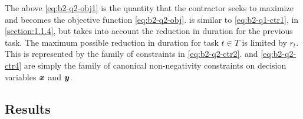 The above \cref{eq:b2-q2-obj1} is the quantity that the contractor seeks to maximize and becomes 
the objective function \cref{eq:b2-q2-obj}.  is similar to 
\cref{eq:b2-q1-ctr1}, in \cref{section:1.1.4}, but takes into account the reduction in duration
for the previous task. The maximum possible reduction in duration for task
$t\in T$ is limited by $r_t$. This is represented by the family of constraints
in \cref{eq:b2-q2-ctr2}.  and \cref{eq:b2-q2-ctr4} are simply
the family of canonical non-negativity constraints on decision variables
$\boldsymbol{x}$ and $\boldsymbol{y}$.

\subsection{Results}
